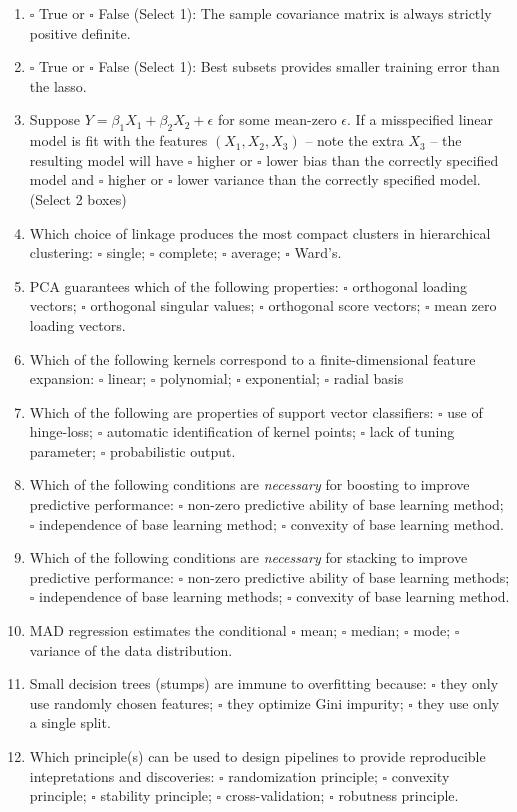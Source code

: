 \documentclass[12pt]{article}
\begin{document}
\begin{enumerate}[label={\bf MC\arabic*.)}]
\item $\square$ True or $\square$ False (Select 1): The sample covariance matrix is always strictly positive definite.
\item $\square$ True or $\square$ False (Select 1): Best subsets provides smaller training error than the lasso.
\item Suppose $Y = \beta_1 X_1 + \beta_2 X_2 + \epsilon$ for some mean-zero $\epsilon$. If a misspecified linear model is fit with the features $(X_1, X_2, X_3)$ -- note the extra $X_3$ -- the resulting model will have $\square$ higher or $\square$ lower bias than the correctly specified model and $\square$ higher or $\square$ lower variance than the correctly specified model. (Select 2 boxes)
\item Which choice of linkage produces the most compact clusters in hierarchical clustering: $\square$ single; $\square$ complete; $\square$ average; $\square$ Ward's. 
\item PCA guarantees which of the following properties: $\square$ orthogonal loading vectors; $\square$ orthogonal singular values; $\square$ orthogonal score vectors; $\square$ mean zero loading vectors. 
\item Which of the following kernels correspond to a finite-dimensional feature expansion: $\square$ linear; $\square$ polynomial; $\square$ exponential; $\square$ radial basis
\item Which of the following are properties of support vector classifiers: $\square$ use of hinge-loss; $\square$ automatic identification of kernel points; $\square$ lack of tuning parameter; $\square$ probabilistic output.
\item Which of the following conditions are \emph{necessary} for boosting to improve predictive performance: $\square$ non-zero predictive ability of base learning method; $\square$ independence of base learning method; $\square$ convexity of base learning method. 
\item Which of the following conditions are \emph{necessary} for stacking to improve predictive performance: $\square$ non-zero predictive ability of base learning methods; $\square$ independence of base learning methods; $\square$ convexity of base learning method. 
\item MAD regression estimates the conditional $\square$ mean; $\square$ median; $\square$ mode; $\square$ variance of the data distribution.
\item Small decision trees (stumps) are immune to overfitting because: $\square$ they only use randomly chosen features; $\square$ they optimize Gini impurity; $\square$ they use only a single split. 
\item Which principle(s) can be used to design pipelines to provide reproducible intepretations and discoveries: $\square$ randomization principle; $\square$ convexity principle; $\square$ stability principle; $\square$ cross-validation; $\square$ robutness principle.
\end{enumerate}
\end{document}
